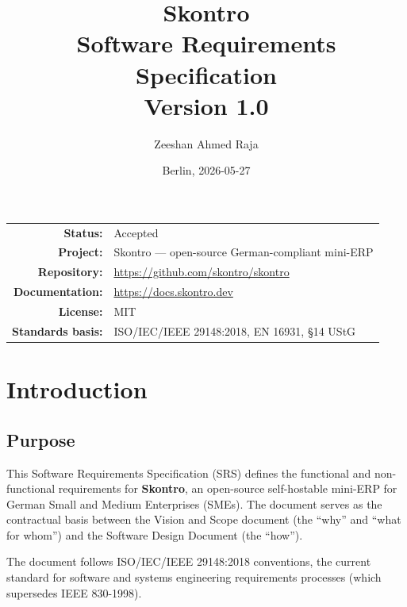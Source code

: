 \documentclass[11pt,a4paper]{article}
\title{
    \vspace*{2cm}
    \Huge\bfseries\textcolor{skontroSlate}{Skontro} \\[0.3cm]
    \Large Software Requirements Specification \\[1cm]
    \large Version 1.0
}
\author{Zeeshan Ahmed Raja}
\date{Berlin, 2026-05-27}
\begin{document}

\begin{titlepage}
\maketitle
\vfill
\begin{center}
    \begin{tabular}{rl}
        \textbf{Status:} & Accepted \\
        \textbf{Project:} & Skontro --- open-source German-compliant mini-ERP \\
        \textbf{Repository:} & \url{https://github.com/skontro/skontro} \\
        \textbf{Documentation:} & \url{https://docs.skontro.dev} \\
        \textbf{License:} & MIT \\
        \textbf{Standards basis:} & ISO/IEC/IEEE 29148:2018, EN 16931, \S14 UStG \\
    \end{tabular}
\end{center}
\vspace*{2cm}
\end{titlepage}

\tableofcontents
\newpage

\section{Introduction}

\subsection{Purpose}

This Software Requirements Specification (SRS) defines the functional and non-functional requirements for \textbf{Skontro}, an open-source self-hostable mini-ERP for German Small and Medium Enterprises (SMEs). The document serves as the contractual basis between the Vision and Scope document (the ``why'' and ``what for whom'') and the Software Design Document (the ``how'').

The document follows ISO/IEC/IEEE 29148:2018 conventions, the current standard for software and systems engineering requirements processes (which supersedes IEEE 830-1998).
\end{document}
